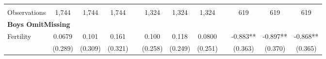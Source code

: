 \begin{landscape}
\begin{table}[htpb!]
\begin{center}
\begin{tabular}{lcccp{2mm}cccp{2mm}ccc}
\begin{footnotesize}\end{footnotesize}&\begin{footnotesize}\end{footnotesize}&\begin{footnotesize}\end{footnotesize}&\begin{footnotesize}\end{footnotesize}&\begin{footnotesize}\end{footnotesize}&\begin{footnotesize}\end{footnotesize}&\begin{footnotesize}\end{footnotesize}&\begin{footnotesize}\end{footnotesize}&\begin{footnotesize}\end{footnotesize}&\begin{footnotesize}\end{footnotesize}&\begin{footnotesize}\end{footnotesize}&\begin{footnotesize}\end{footnotesize}\\Observations&1,744&1,744&1,744&&1,324&1,324&1,324&&619&619&619\\
\multicolumn{12}{l}{\textbf{Boys OmitMissing}}\\ 
Fertility&0.0679&0.101&0.161&&0.100&0.118&0.0800&&-0.883**&-0.897**&-0.868**\\
&(0.289)&(0.309)&(0.321)&&(0.258)&(0.249)&(0.251)&&(0.363)&(0.370)&(0.365)\\

\end{tabular}
\end{center}
\end{table}
\end{landscape}
